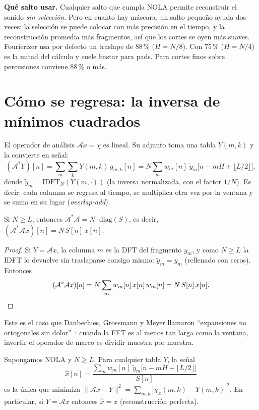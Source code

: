 \begin{estudio}
\textbf{Qué salto usar.} Cualquier salto que cumpla NOLA permite reconstruir el sonido
\emph{sin selección}. Pero en cuanto hay máscara, un salto pequeño ayuda dos veces: la selección
se puede colocar con más precisión en el tiempo, y la reconstrucción promedia más fragmentos, así
que los cortes se oyen más suaves. Fourierizer usa por defecto un traslape de 88\,\% ($H=N/8$).
Con 75\,\% ($H=N/4$) es la mitad del cálculo y suele bastar para pads. Para cortes finos sobre
percusiones conviene 88\,\% o más.
\end{estudio}

\section{Cómo se regresa: la inversa de mínimos cuadrados}

El operador de análisis $\mathcal A x=\chi$ es lineal. Su adjunto toma una tabla $Y(m,k)$ y la
convierte en señal:
\[
  (\mathcal A^{*}Y)[n]=\sum_{m}\sum_{k}Y(m,k)\,g_{m,k}[n]
  =N\sum_m w_m[n]\;\tilde y_m\bigl[n-mH+\lfloor L/2\rfloor\bigr],
\]
donde $\tilde y_m=\mathrm{IDFT}_N(Y(m,\cdot))$ (la inversa normalizada, con el factor $1/N$). Es
decir: cada columna se regresa al tiempo, se multiplica otra vez por la ventana y se suma en su
lugar (\emph{overlap-add}).

\begin{proposicion}\label{prop:diagonal}
Si $N\ge L$, entonces $\mathcal A^{*}\mathcal A=N\cdot\mathrm{diag}(S)$, es decir,
$(\mathcal A^{*}\mathcal A x)[n]=N\,S[n]\,x[n]$.
\end{proposicion}

\begin{proof}
Si $Y=\mathcal Ax$, la columna $m$ es la DFT del fragmento $y_m$, y como $N\ge L$ la IDFT lo
devuelve sin traslaparse consigo mismo: $\tilde y_m=y_m$ (rellenado con ceros). Entonces
\[
  (\mathcal A^{*}\mathcal Ax)[n]=N\sum_m w_m[n]\,x[n]\,w_m[n]=N\,S[n]\,x[n]. \qedhere
\]
\end{proof}

Este es el caso que Daubechies, Grossmann y Meyer llamaron ``expansiones no ortogonales sin
dolor''~\cite{daubechies1986}: cuando la FFT es al menos tan larga como la ventana, invertir el
operador de marco es dividir muestra por muestra.

\begin{teorema}\label{teo:minimos-cuadrados}
Supongamos NOLA y $N\ge L$. Para cualquier tabla $Y$, la señal
\begin{equation}\label{eq:istft}
  \hat x[n]=\frac{\displaystyle\sum_m w_m[n]\;\tilde y_m\bigl[n-mH+\lfloor L/2\rfloor\bigr]}{S[n]}
\end{equation}
es la única que minimiza $\|\mathcal Ax-Y\|^2=\sum_{m,k}|\chi_x(m,k)-Y(m,k)|^2$. En particular, si
$Y=\mathcal Ax$ entonces $\hat x=x$ (reconstrucción perfecta).
\end{teorema}

